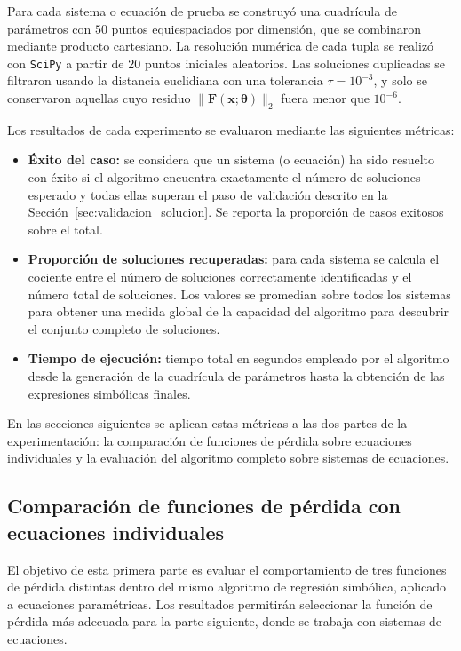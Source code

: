 \documentclass[12pt,a4paper]{article} \usepackage[utf8]{inputenc} \usepackage[spanish]{babel} \usepackage{amsmath, amssymb, amsthm} \usepackage{bm} \usepackage{float} \usepackage{longtable} \usepackage[hidelinks]{hyperref}
\newcommand{\xvec}{\mathbf{x}} \newcommand{\thetavec}{\boldsymbol{\theta}} \newcommand{\Fvec}{\mathbf{F}} \newcommand{\R}{\mathbb{R}} \newcommand{\norm}[1]{\left\lVert#1\right\rVert} \newcommand{\loss}{\mathcal{L}} \newcommand{\dataset}{\mathcal{D}} \newcommand{\jac}{\mathbf{J}}
\begin{document}
Para cada sistema o ecuación de prueba se construyó una cuadrícula de parámetros con $50$ puntos equiespaciados por dimensión, que se combinaron mediante producto cartesiano. La resolución numérica de cada tupla se realizó con \texttt{SciPy} \cite{virtanen2020scipy} a partir de $20$ puntos iniciales aleatorios. Las soluciones duplicadas se filtraron usando la distancia euclidiana con una tolerancia $\tau = 10^{-3}$, y solo se conservaron aquellas cuyo residuo $\|\Fvec(\xvec; \thetavec)\|_2$ fuera menor que $10^{-6}$.

Los resultados de cada experimento se evaluaron mediante las siguientes métricas:

\begin{itemize}
\item \textbf{Éxito del caso:} se considera que un sistema (o ecuación) ha sido resuelto con éxito si el algoritmo encuentra exactamente el número de soluciones esperado y todas ellas superan el paso de validación descrito en la Sección~\ref{sec:validacion_solucion}. Se reporta la proporción de casos exitosos sobre el total.

\item \textbf{Proporción de soluciones recuperadas:} para cada sistema se calcula el cociente entre el número de soluciones correctamente identificadas y el número total de soluciones. Los valores se promedian sobre todos los sistemas para obtener una medida global de la capacidad del algoritmo para descubrir el conjunto completo de soluciones.

\item \textbf{Tiempo de ejecución:} tiempo total en segundos empleado por el algoritmo desde la generación de la cuadrícula de parámetros hasta la obtención de las expresiones simbólicas finales.
\end{itemize}

En las secciones siguientes se aplican estas métricas a las dos partes de la experimentación: la comparación de funciones de pérdida sobre ecuaciones individuales y la evaluación del algoritmo completo sobre sistemas de ecuaciones.

\subsection{Comparación de funciones de pérdida con ecuaciones individuales}
\label{sec:fase1}

El objetivo de esta primera parte es evaluar el comportamiento de tres funciones de pérdida distintas dentro del mismo algoritmo de regresión simbólica, aplicado a ecuaciones paramétricas. Los resultados permitirán seleccionar la función de pérdida más adecuada para la parte siguiente, donde se trabaja con sistemas de ecuaciones.
\end{document}
